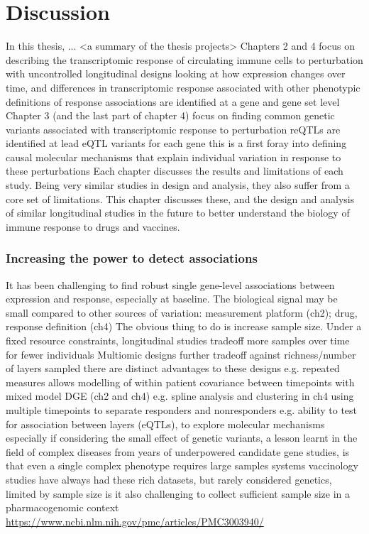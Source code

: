 %
%

\chapter{Discussion}
\label{chap:discussion}

\begin{outline}

\1 In this thesis, ... <a summary of the thesis projects>
    \2 Chapters 2 and 4 focus on describing the transcriptomic response of circulating immune cells to perturbation with uncontrolled longitudinal designs
        \3 looking at how expression changes over time, and differences in transcriptomic response associated with other phenotypic definitions of response
        \3 associations are identified at a gene and gene set level
    \2 Chapter 3 (and the last part of chapter 4) focus on finding common genetic variants associated with transcriptomic response to perturbation
        \3 reQTLs are identified at lead eQTL variants for each gene
        \3 this is a first foray into defining causal molecular mechanisms that explain individual variation in response to these perturbations
    \2 Each chapter discusses the results and limitations of each study.
    \2 Being very similar studies in design and analysis, they also suffer from a core set of limitations.
    \2 This chapter discusses these, and the design and analysis of similar longitudinal studies in the future to better understand the biology of immune response to drugs and vaccines.

\subsection{Increasing the power to detect associations}

\1 It has been challenging to find robust single gene-level associations between expression and response, especially at baseline.
    \2 The biological signal may be small compared to other sources of variation: measurement platform (ch2); drug, response definition (ch4)
    \2 The obvious thing to do is increase sample size.
        \3 Under a fixed resource constraints, longitudinal studies tradeoff more samples over time for fewer individuals
        \3 Multiomic designs further tradeoff against richness/number of layers sampled
    \2 there are distinct advantages to these designs
        \3 e.g. repeated measures allows modelling of within patient covariance between timepoints with mixed model DGE (ch2 and ch4)
        \3 e.g. spline analysis and clustering in ch4 using multiple timepoints to separate responders and nonresponders
        \3 e.g. ability to test for association between layers (eQTLs), to explore molecular mechanisms
    \2 especially if considering the small effect of genetic variants, a lesson learnt in the field of complex diseases from years of underpowered candidate gene studies, is that even a single complex phenotype requires large samples
    \2 systems vaccinology studies have always had these rich datasets, but rarely considered genetics, limited by sample size
    \2 is it also challenging to collect sufficient sample size in a pharmacogenomic context \url{https://www.ncbi.nlm.nih.gov/pmc/articles/PMC3003940/} 


\end{outline}
